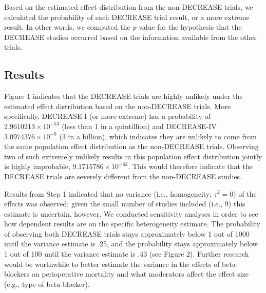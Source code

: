 \documentclass[]{article}
\begin{document}
Based on the estimated effect distribution from the non-DECREASE trials,
we calculated the probability of each DECREASE trial result, or a more
extreme result. In other words, we computed the \emph{p}-value for the
hypothesis that the DECREASE studies occurred based on the information
available from the other trials.

\subsection{Results}\label{results-1}

Figure 1 indicates that the DECREASE trials are highly unlikely under
the estimated effect distribution based on the non-DECREASE trials. More
specifically, DECREASE-I (or more extreme) has a probability of
\(2.9610213\times 10^{-53}\) (less than 1 in a quintillion) and
DECREASE-IV \(3.0974376\times 10^{-9}\) (3 in a billion), which
indicates they are unlikely to come from the same population effect
distribution as the non-DECREASE trials. Observing two of such extremely
unlikely results in this population effect distribution jointly is
highly improbable, \(9.1715786\times 10^{-62}\). This would therefore
indicate that the DECREASE trials are severely different from the
non-DECREASE studies.

Results from Step 1 indicated that no variance (i.e., homogeneity;
\(\tau^2=0\)) of the effects was observed; given the small number of
studies included (i.e., 9) this estimate is uncertain, however. We
conducted sensitivity analyses in order to see how dependent results are
on the specific heterogeneity estimate. The probability of observing
both DECREASE trials stays approximately below 1 out of 1000 until the
variance estimate is .25, and the probability stays approximately below
1 out of 100 until the variance estimate is .43 (see Figure 2). Further
research would be worthwhile to better estimate the variance in the
effects of beta-blockers on perioperative mortality and what moderators
affect the effect size (e.g., type of beta-blocker).
\end{document}
